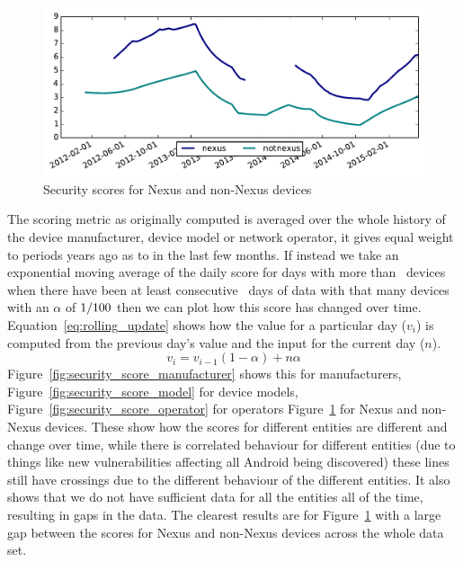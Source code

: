 \begin{figure}
\includegraphics[width=\columnwidth]{figures/security_score_summary}
\caption{Security scores for Nexus and non-Nexus devices}
\label{fig:security_score_summary}
\end{figure}
The scoring metric as originally computed is averaged over the whole history of the device manufacturer, device model or network operator, it gives equal weight to periods years ago as to in the last few months.
If instead we take an exponential moving average of the daily score for days with more than \daSigNumDevicesDay\ devices when there have been at least consecutive \daSigNumDays\ days of data with that many devices with an $\alpha$ of $1/100$ then we can plot how this score has changed over time.
Equation~\ref{eq:rolling_update} shows how the value for a particular day ($v_i$) is computed from the previous day's value and the input for the current day ($n$).
\begin{equation}
v_i = v_{i-1} (1 - \alpha) + n \alpha
\label{eq:rolling_update}
\end{equation}
Figure~\ref{fig:security_score_manufacturer} shows this for manufacturers, Figure~\ref{fig:security_score_model} for device models, Figure~\ref{fig:security_score_operator} for operators Figure~\ref{fig:security_score_summary} for Nexus and non-Nexus devices.
These show how the scores for different entities are different and change over time, while there is correlated behaviour for different entities (due to things like new vulnerabilities affecting all Android being discovered) these lines still have crossings due to the different behaviour of the different entities.
It also shows that we do not have sufficient data for all the entities all of the time, resulting in gaps in the data.
The clearest results are for Figure~\ref{fig:security_score_summary} with a large gap between the scores for Nexus and non-Nexus devices across the whole data set.

